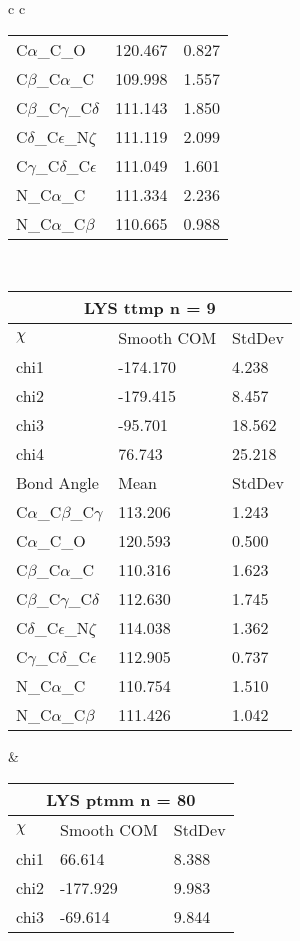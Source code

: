 \begin{longtable}{ c c }
\begin{tabular}{ l l l }
  C$\alpha$\_C\_O & 120.467 & 0.827\\
  C$\beta$\_C$\alpha$\_C & 109.998 & 1.557\\
  C$\beta$\_C$\gamma$\_C$\delta$ & 111.143 & 1.850\\
  C$\delta$\_C$\epsilon$\_N$\zeta$ & 111.119 & 2.099\\
  C$\gamma$\_C$\delta$\_C$\epsilon$ & 111.049 & 1.601\\
  N\_C$\alpha$\_C & 111.334 & 2.236\\
  N\_C$\alpha$\_C$\beta$ & 110.665 & 0.988\\
  \bottomrule
  \end{tabular}
  \\
  \begin{tabular}{ l l l }
  \toprule
  \multicolumn{3}{c}{LYS \textbf{ttmp} n = 9} \\ \toprule
  $\chi$       & Smooth COM & StdDev \\ \midrule
  chi1 & -174.170 & 4.238 \\ 
  chi2 & -179.415 & 8.457 \\ 
  chi3 & -95.701 & 18.562 \\ 
  chi4 & 76.743 & 25.218 \\ \midrule
  Bond Angle   & Mean     & StdDev \\ \midrule
  C$\alpha$\_C$\beta$\_C$\gamma$ & 113.206 & 1.243\\
  C$\alpha$\_C\_O & 120.593 & 0.500\\
  C$\beta$\_C$\alpha$\_C & 110.316 & 1.623\\
  C$\beta$\_C$\gamma$\_C$\delta$ & 112.630 & 1.745\\
  C$\delta$\_C$\epsilon$\_N$\zeta$ & 114.038 & 1.362\\
  C$\gamma$\_C$\delta$\_C$\epsilon$ & 112.905 & 0.737\\
  N\_C$\alpha$\_C & 110.754 & 1.510\\
  N\_C$\alpha$\_C$\beta$ & 111.426 & 1.042\\
  \bottomrule
  \end{tabular}
  &
  \begin{tabular}{ l l l }
  \toprule
  \multicolumn{3}{c}{LYS \textbf{ptmm} n = 80} \\ \toprule
  $\chi$       & Smooth COM & StdDev \\ \midrule
  chi1 & 66.614 & 8.388 \\ 
  chi2 & -177.929 & 9.983 \\ 
  chi3 & -69.614 & 9.844 \\ 

\end{tabular}
\end{longtable}
